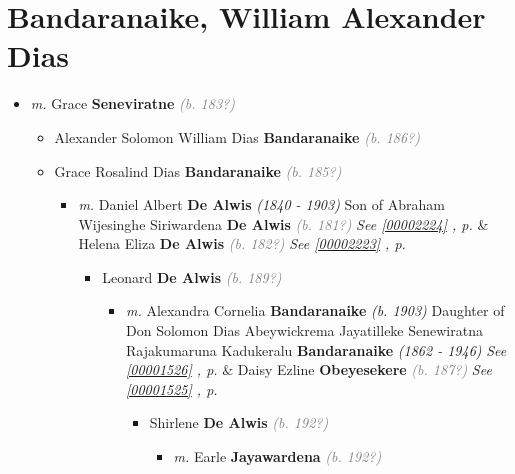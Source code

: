 \documentclass[10pt, openany]{book}
\begin{document}
\chapter{Bandaranaike, William Alexander Dias}
\label{00002442}
\textcolor{slmaroon}{\textit{}}
\begin{itemize}
\item{\textit{m.} Grace \textbf{Seneviratne} \textcolor{gray}{\textit{(b. 183?)}}   \label{couple:00002442:00002443} \begin{itemize}
\item{Alexander Solomon William Dias \textbf{Bandaranaike} \textcolor{gray}{\textit{(b. 186?)}}
    }
\item{Grace Rosalind Dias \textbf{Bandaranaike} \textcolor{gray}{\textit{(b. 185?)}}
\begin{itemize}
\item{\textit{m.} Daniel Albert \textbf{De Alwis} \textcolor{slorange}{\textit{(1840 - 1903)}} Son of  Abraham Wijesinghe Siriwardena \textbf{De Alwis} \textcolor{gray}{\textit{(b. 181?)}} \textcolor{slteal}{\textit{See  \autoref{00002224} \textit{, p. \pageref{00002224} }}}  \&  Helena Eliza \textbf{De Alwis} \textcolor{gray}{\textit{(b. 182?)}} \textcolor{slteal}{\textit{See  \autoref{00002223} \textit{, p. \pageref{00002223} }}}   \label{couple:00002229:00002446} \begin{itemize}
\item{Leonard \textbf{De Alwis} \textcolor{gray}{\textit{(b. 189?)}}
\begin{itemize}
\item{\textit{m.} Alexandra Cornelia \textbf{Bandaranaike} \textcolor{slorange}{\textit{(b. 1903)}} Daughter of  Don Solomon Dias Abeywickrema Jayatilleke Senewiratna Rajakumaruna Kadukeralu \textbf{Bandaranaike} \textcolor{slorange}{\textit{(1862 - 1946)}} \textcolor{slteal}{\textit{See  \autoref{00001526} \textit{, p. \pageref{00001526} }}}  \&  Daisy Ezline \textbf{Obeyesekere} \textcolor{gray}{\textit{(b. 187?)}} \textcolor{slteal}{\textit{See  \autoref{00001525} \textit{, p. \pageref{00001525} }}}   \label{couple:00001544:00001545} \begin{itemize}
\item{Shirlene \textbf{De Alwis} \textcolor{gray}{\textit{(b. 192?)}}
\begin{itemize}
\item{\textit{m.} Earle \textbf{Jayawardena} \textcolor{gray}{\textit{(b. 192?)}}   \label{couple:00001546:00001547} \begin{itemize}

\end{itemize}}
\end{itemize}}
\end{itemize}}
\end{itemize}}
\end{itemize}}
\end{itemize}}
\end{itemize}}
\end{itemize}
\end{document}
